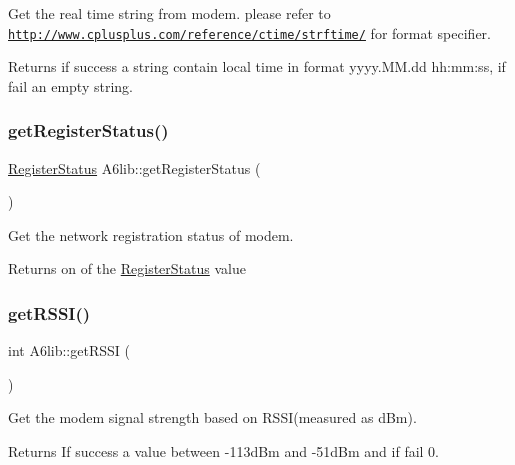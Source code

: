 Get the real time string from modem. please refer to \href{http://www.cplusplus.com/reference/ctime/strftime/}{\tt http\+://www.\+cplusplus.\+com/reference/ctime/strftime/} for format specifier. \begin{DoxyReturn}{Returns}
if success a string contain local time in format yyyy.\+M\+M.\+dd hh\+:mm\+:ss, if fail an empty string. 
\end{DoxyReturn}
\mbox{\label{class_a6lib_a7a8beb6c42199ea32f9a73f45f7b500e}} 
\subsubsection{\texorpdfstring{get\+Register\+Status()}{getRegisterStatus()}}
{\footnotesize\ttfamily \mbox{\hyperlink{_a6lib_8h_a0a43f46ad95cebb665a0d371219a6015}{Register\+Status}} A6lib\+::get\+Register\+Status (\begin{DoxyParamCaption}{ }\end{DoxyParamCaption})}

Get the network registration status of modem. \begin{DoxyReturn}{Returns}
on of the \mbox{\hyperlink{_a6lib_8h_a0a43f46ad95cebb665a0d371219a6015}{Register\+Status}} value 
\end{DoxyReturn}
\mbox{\label{class_a6lib_a07fc81b3217b490883ec402795839fad}} 
\subsubsection{\texorpdfstring{get\+R\+S\+S\+I()}{getRSSI()}}
{\footnotesize\ttfamily int A6lib\+::get\+R\+S\+SI (\begin{DoxyParamCaption}{ }\end{DoxyParamCaption})}

Get the modem signal strength based on R\+S\+S\+I(measured as d\+Bm). \begin{DoxyReturn}{Returns}
If success a value between -\/113d\+Bm and -\/51d\+Bm and if fail 0. 
\end{DoxyReturn}
\mbox{\label{class_a6lib_a90a1e3733155181d56c02f7973066ddf}} 
